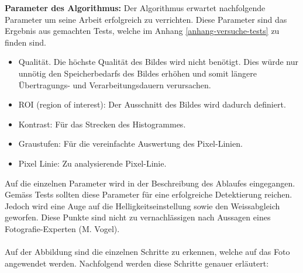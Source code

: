 \textbf{Parameter des Algorithmus:}
Der Algorithmus erwartet nachfolgende Parameter um seine Arbeit erfolgreich zu verrichten. Diese Parameter sind das Ergebnis aus gemachten Tests, welche im Anhang \ref{anhang-versuche-tests} zu finden sind.
\begin{itemize}
	\item Qualität. Die höchste Qualität des Bildes wird nicht benötigt. Dies würde nur unnötig den Speicherbedarfs des Bildes erhöhen und somit längere Übertragungs- und Verarbeitungsdauern verursachen. 
	\item ROI (region of interest): Der Ausschnitt des Bildes wird dadurch definiert.
	\item Kontrast: Für das Strecken des Histogrammes.
	\item Graustufen: Für die vereinfachte Auswertung des Pixel-Linien.
	\item Pixel Linie: Zu analysierende Pixel-Linie.
\end{itemize}
Auf die einzelnen Parameter wird in der Beschreibung des Ablaufes eingegangen. Gemäss Tests sollten diese Parameter für eine erfolgreiche Detektierung reichen. Jedoch wird eine Auge auf die Helligkeitseinstellung sowie den Weissabgleich geworfen. Diese Punkte sind nicht zu vernachlässigen nach Aussagen eines Fotografie-Experten (M. Vogel).\\
\\
Auf der Abbildung sind die einzelnen Schritte zu erkennen, welche auf das Foto angewendet werden. Nachfolgend werden diese Schritte genauer erläutert:

